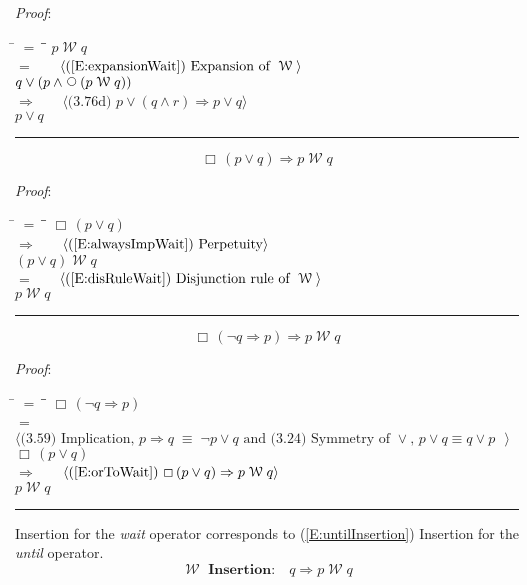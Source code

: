 \documentclass[12pt, fleqn, leqno]{article}
\newcommand{\lgap}{2pt}                             %
\newcommand{\mymathindent}{24pt}                    %
\newcommand{\equivs}{\ensuremath{\;\equiv\;}}       %
\newcommand{\impl}{\ensuremath{\Rightarrow}}        %
\newcommand{\Wait}{\;\mathcal{W}\;}
\newcommand{\Next}{\;\,\text{\raisebox{3.5pt}{\circle{6}}}}
\newcommand{\Always}{\Box\,}
\newcommand{\myqed}{\rule[-.23ex]{1.2ex}{2.0ex}}
\newcommand{\myqedtab}{\hspace{384pt}}              %
\newcommand{\Gll} {\langle}                         %
\newcommand{\Ggg} {\rangle}                         %
\newcommand{\Hint}[1]     {\ \ \ $\Gll              \mbox{#1} \Ggg$ }   %
\begin{document}
\emph{Proof}:
\begin{tabbing}
\hspace{\mymathindent} \= $= \;$ \= \myqedtab \= \kill
\> \> $p \Wait q$\\[\lgap]
\> $=$ \> \Hint{(\ref{E:expansionWait}) Expansion of $\Wait$} \\[\lgap]
\> \> $q \lor (p \land \Next(p \Wait q))$\\[\lgap]
\> $\impl$ \> \Hint{(3.76d) $p\lor (q\land r) \impl p\lor q$} \\[\lgap]
\> \> $p \lor q$ \quad \myqed
\end{tabbing}
\begin{equation}\label{E:orToWait}
\Always (p\lor q) \impl p \Wait q
\end{equation}

\emph{Proof}:
\begin{tabbing}
\hspace{\mymathindent} \= $= \;$ \= \myqedtab \= \kill
\> \> $\Always (p\lor q)$\\[\lgap]
\> $\impl$ \> \Hint{(\ref{E:alwaysImpWait}) Perpetuity} \\[\lgap]
\> \> $(p\lor q)\Wait q$\\[\lgap]
\> $=$ \> \Hint{(\ref{E:disRuleWait}) Disjunction rule of $\Wait$} \\[\lgap]
\> \> $p \Wait q$ \quad \myqed
\end{tabbing}
\begin{equation}\label{E:notqimpliespToWait}
\Always (\neg q \impl p) \impl p \Wait q
\end{equation}

\emph{Proof}:
\begin{tabbing}
\hspace{\mymathindent} \= $= \;$ \= \myqedtab \= \kill
\> \> $\Always (\neg q \impl p)$\\[\lgap]
\> $=$ \> \Hint{(3.59) Implication, $p\impl q \equivs \neg p \lor q$ and (3.24) Symmetry of $\lor$, $p\lor q \equiv q\lor p$ } \\[\lgap]
\> \> $\Always (p \lor q)$\\[\lgap]
\> $\impl$ \> \Hint{(\ref{E:orToWait}) $\Always (p\lor q) \impl p \Wait q$} \\[\lgap]
\> \> $p \Wait q$ \quad \myqed
\end{tabbing}

Insertion for the \textit{wait} operator corresponds to
(\ref{E:untilInsertion}) Insertion for the \textit{until} operator.
\begin{equation}\label{E:waitInsertion}
\textbf{$\Wait$ Insertion:}\quad q \impl p \Wait q
\end{equation}
\end{document}
